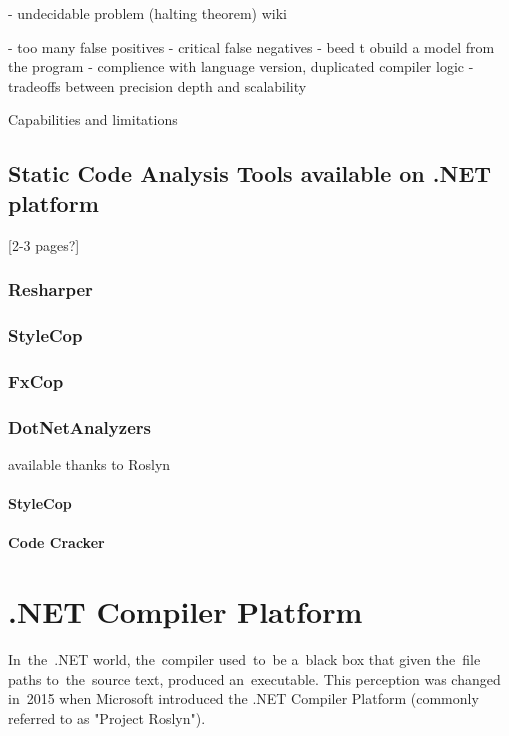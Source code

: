 \documentclass[
  digital, %
  table,   %
  lof,     %
  lot,     %
  oneside,
]{fithesis3}
\begin{document}
- undecidable problem (halting theorem) wiki

- too many false positives
- critical false negatives
- beed t obuild a model from the program - complience with language version, duplicated compiler logic
- tradeoffs between precision depth and scalability

Capabilities and limitations   
  
\pagebreak 
\section{Static Code Analysis Tools available on .NET platform}
[2-3 pages?]
\subsection{Resharper}

\subsection{StyleCop}

\subsection{FxCop}
  
\subsection{DotNetAnalyzers}
  available thanks to Roslyn
\subsubsection{StyleCop}
\subsubsection{Code Cracker}
  
\chapter{.NET Compiler Platform}
In~the~.NET world, the~compiler used~to~be a~black box that given the~file paths to~the~source text, produced an~executable. This perception was changed in~2015 when Microsoft introduced the .NET Compiler Platform (commonly referred to as "Project Roslyn").  
\end{document}

